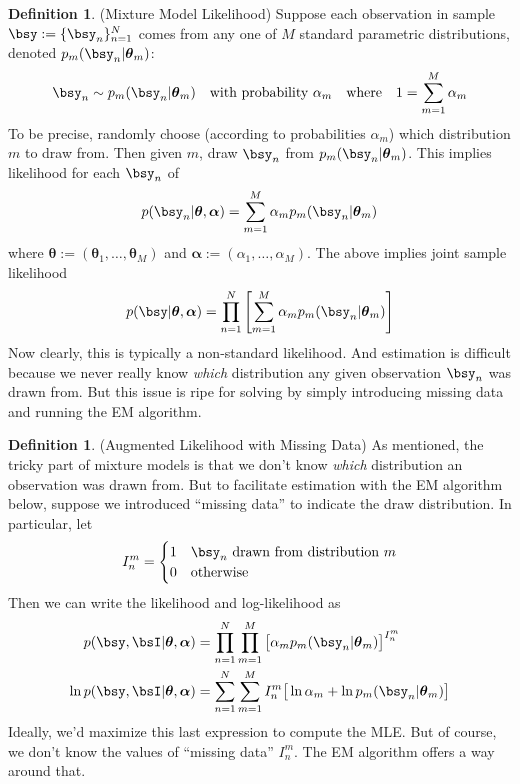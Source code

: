 \documentclass[12pt]{article}
\theoremstyle{plain}
\theoremstyle{definition}
\newtheorem{defn}[thm]{Definition}
\theoremstyle{remark}
\newcommand{\bstheta}{\boldsymbol{\theta}}
\newcommand{\bsalpha}{\boldsymbol{\alpha}}
\newcommand{\sumnN}{\sum^N_{n=1}}
\newcommand{\prodnN}{\prod^N_{n=1}}
\newcommand{\nN}{_{n=1}^N}
\begin{document}
\begin{defn}(Mixture Model Likelihood)
Suppose each observation in sample $\bsy:=\{\bsy_n\}\nN$ comes from any
one of $M$ standard parametric distributions, denoted
$p_m(\bsy_n|\bstheta_m)$:
\begin{align*}
  \bsy_n \sim p_m(\bsy_n|\bstheta_m)
  \quad
  \text{with probability $\alpha_m$}
  \quad\text{where}\quad
  1 = \sum_{m=1}^M \alpha_m
\end{align*}
To be precise, randomly choose (according to probabilities $\alpha_m$)
which distribution $m$ to draw from. Then given $m$, draw $\bsy_n$ from
$p_m(\bsy_n|\bstheta_m)$. This implies likelihood for each $\bsy_n$ of
\begin{align*}
  p(\bsy_n|\bstheta,\bsalpha)
  =
  \sum_{m=1}^M \alpha_m p_m(\bsy_n|\bstheta_m)
\end{align*}
where $\bstheta:=(\bstheta_1,\ldots,\bstheta_M)$ and
$\bsalpha:=(\alpha_1,\ldots,\alpha_M)$.
The above implies joint sample likelihood
\begin{align*}
  p(\bsy|\bstheta,\bsalpha)
  = \prodnN \left[\sum_{m=1}^M \alpha_m p_m(\bsy_n|\bstheta_m)\right]
\end{align*}
Now clearly, this is typically a non-standard likelihood.
And estimation is difficult because we never really know \emph{which}
distribution any given observation $\bsy_n$ was drawn from.
But this issue is ripe for solving by simply introducing missing data
and running the EM algorithm.
\end{defn}

\begin{defn}(Augmented Likelihood with Missing Data)
As mentioned, the tricky part of mixture models is that we don't know
\emph{which} distribution an observation was drawn from.
But to facilitate estimation with the EM algorithm below, suppose we
introduced ``missing data'' to indicate the draw distribution.
In particular, let
\begin{align*}
  I_n^m =
  \begin{cases}
    1 & \text{$\bsy_n$ drawn from distribution $m$} \\
    0 & \text{otherwise}
  \end{cases}
\end{align*}
Then we can write the likelihood and log-likelihood as
\begin{align}
  p(\bsy,\bsI|\bstheta,\bsalpha)
  &= \prodnN
    \prod_{m=1}^M
    \big[
    \alpha_m p_m(\bsy_n|\bstheta_m)
    \big]^{I_n^m}
  \\
  \ln p(\bsy,\bsI|\bstheta,\bsalpha)
  &=
    \sumnN
    \sum_{m=1}^M
    I_n^m
    \big[
    \ln \alpha_m
    + \ln p_m(\bsy_n|\bstheta_m)
    \big]
    \label{mixtureloglik}
\end{align}
Ideally, we'd maximize this last expression to compute the MLE.
But of course, we don't know the values of ``missing data'' $I_n^m$.
The EM algorithm offers a way around that.
\end{defn}
\end{document}

